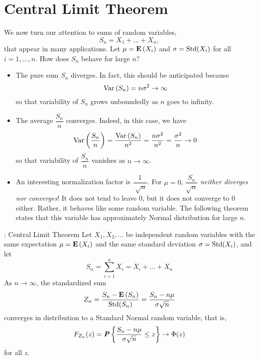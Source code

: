 \section{Central Limit Theorem}

We now turn our attention to sums of random variables,
\begin{equation*}
    S_n = X_1 + ... + X_n,
\end{equation*}
that appear in many applications. Let $\mu = \mathbf{E}\left(X_i\right)$ and $\sigma = \textnormal{Std}(X_i)$ for all $i = 1, ..., n$. How does $S_n$ behave for large $n$?

\begin{itemize}
    \item The pure sum $S_n$ diverges. In fact, this should be anticipated because
    \begin{equation*}
        \text{Var}\left( S_n \right) = n\sigma^2 \rightarrow \infty
    \end{equation*}
    so that variability of $S_n$ grows unboundedly as $n$ goes to infinity.
    \item The average $\dfrac{S_n}{n}$ converges. Indeed, in this case, we have
    \begin{equation*}
        \text{Var}\left( \frac{S_n}{n} \right) = \frac{\text{Var}\left( S_n \right)}{n^2} = \frac{n\sigma^2}{n^2} = \frac{\sigma^2}{n} \rightarrow 0
    \end{equation*}
    so that variability of $\dfrac{S_n}{n}$ vanishes as $n \to \infty$.
    \item An interesting normalization factor is $\dfrac{1}{\sqrt[]{n}}$. For $\mu = 0$, $\dfrac{S_n}{\sqrt{n}}$ \textit{neither diverges nor converges}! It does not tend to leave 0, but it does not converge to 0 either. Rather, it behaves like some random variable. The following theorem states that this variable has approximately Normal distribution for large $n$.
\end{itemize}

\begin{theorem}{: Central Limit Theorem}
    Let $X_1, X_2, ...$ be independent random variables with the same expectation $\mu = \mathbf{E}\left(X_i\right)$ and the same standard deviation $\sigma = \textnormal{Std}(X_i)$, and let
    \begin{equation*}
        S_n = \sum_{i=1}^{n} X_i = X_i + ... + X_n
    \end{equation*}
    As $n \to \infty$, the standardized sum
    \begin{equation*}
        Z_n = \frac{S_n - \mathbf{E}\left(S_n\right)}{\textnormal{Std}(S_n)} = \frac{S_n - n\mu}{\sigma\sqrt{n}}
    \end{equation*}
    converges in distribution to a Standard Normal random variable, that is,
    \begin{equation}
        F_{Z_n}(z) = \textbf{\textit{P}}\left\{\frac{S_n-n\mu}{\sigma\sqrt{n}} \leq z\right\} \to \Phi(z)
    \end{equation}
    for all $z$.
\end{theorem}

